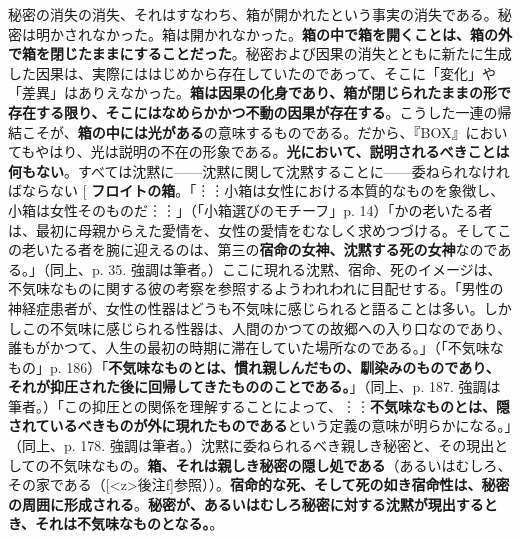 \documentclass[9pt,b5j,twoside,twocolumn]{utarticle}
\makeatletter
\def\yakuchu{%
\@ifnextchar[\@xfootnote %
{\stepcounter{yakuchu}%
\protected@xdef\@thefnmark{\theyakuchu}%
\@footnotemark\@footnotetext}}
\makeatother
\begin{document}
秘密の消失の消失、それはすなわち、箱が開かれたという事実の消失である。秘密は明かされなかった。箱は開かれなかった。\textbf{箱の中で箱を開くことは、箱の外で箱を閉じたままにすることだった}。秘密および因果の消失とともに新たに生成した因果は、実際にははじめから存在していたのであって、そこに「変化」や「差異」はありえなかった。\textbf{箱は因果の化身であり、箱が閉じられたままの形で存在する限り、そこにはなめらかかつ不動の因果が存在する}。こうした一連の帰結こそが、\textbf{箱の中には光がある}の意味するものである。だから、『BOX』においてもやはり、光は説明の不在の形象である。\textbf{光において、説明されるべきことは何もない}。すべては沈黙に------沈黙に関して沈黙することに------委ねられなければならない\yakuchu{\textbf{フロイトの箱}。「︙︙小箱は女性における本質的なものを象徴し、小箱は女性そのものだ︙︙」（「小箱選びのモチーフ」p. 14）「かの老いたる者は、最初に母親からえた愛情を、女性の愛情をむなしく求めつづける。そしてこの老いたる者を腕に迎えるのは、第三の\textbf{宿命の女神、沈黙する死の女神}なのである。」（同上、p. 35. 強調は筆者。）ここに現れる沈黙、宿命、死のイメージは、不気味なものに関する彼の考察を参照するようわれわれに目配せする。「男性の神経症患者が、女性の性器はどうも不気味に感じられると語ることは多い。しかしこの不気味に感じられる性器は、人間のかつての故郷への入り口なのであり、誰もがかつて、人生の最初の時期に滞在していた場所なのである。」（「不気味なもの」p. 186）「\textbf{不気味なものとは、慣れ親しんだもの、馴染みのものであり、それが抑圧された後に回帰してきたもののことである。}」（同上、p. 187. 強調は筆者。）「この抑圧との関係を理解することによって、︙︙\textbf{不気味なものとは、隠されているべきものが外に現れたものである}という定義の意味が明らかになる。」（同上、p. 178. 強調は筆者。）沈黙に委ねられるべき親しき秘密と、その現出としての不気味なもの。\textbf{箱、それは親しき秘密の隠し処である}（あるいはむしろ、その家である（[\pbox<z>{後注}f]参照））。\textbf{宿命的な死、そして死の如き宿命性は、秘密の周囲に形成される}。\textbf{秘密が、あるいはむしろ秘密に対する沈黙が現出するとき、それは不気味なものとなる。}}。
\end{document}
